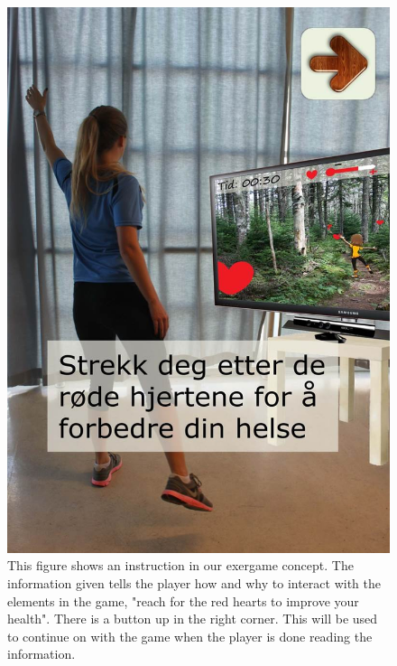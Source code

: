 \begin{figure} [H]
\centering
\includegraphics[scale=0.7]{KineIntro.jpg}
\caption[Instruction]{This figure shows an instruction in our exergame concept. The information given tells the player how and why to interact with the elements in the game, "reach for the red hearts to improve your health". There is a button up in the right corner. This will be used to continue on with the game when the player is done reading the information.}
\label{fig:kineintro}
\end{figure}

